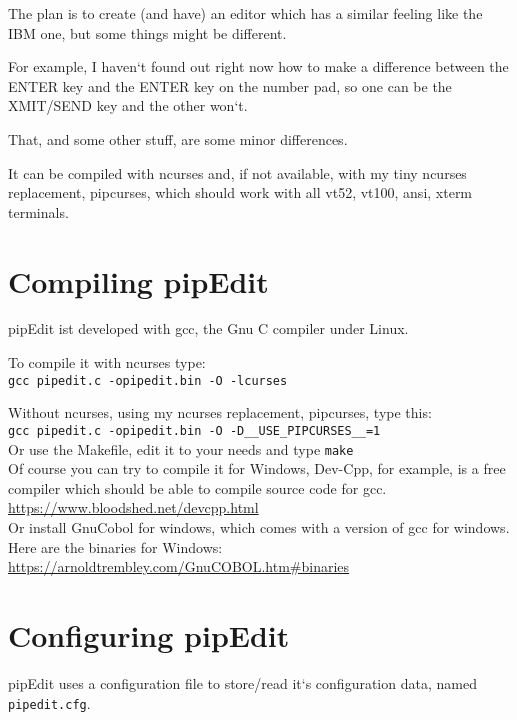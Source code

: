 \documentclass{report}
\begin{document}
The plan is to create (and have) an editor which has a similar feeling like the IBM one, but some things might be different. 


For example, I haven‘t found out right now how to make a difference between the ENTER key and the ENTER key on the number pad, so one can be the XMIT/SEND key and the other won‘t.


That, and some other stuff, are some minor differences.


It can be compiled with ncurses and, if not available, with my tiny ncurses replacement, pipcurses, which should work with all vt52, vt100, ansi, xterm terminals.



\chapter{Compiling pipEdit}

pipEdit ist developed with gcc, the Gnu C compiler under Linux.

To compile it with ncurses type: \\

\texttt{gcc pipedit.c -opipedit.bin -O -lcurses} \break

Without ncurses, using my ncurses replacement, pipcurses, type this: \\

\texttt{gcc pipedit.c -opipedit.bin -O -D\_\_USE\_PIPCURSES\_\_=1} \\

Or use the Makefile, edit it to your needs and type \texttt{make} \\

Of course you can try to compile it for Windows, Dev-Cpp, for example, is a free compiler which should be able to compile source code for gcc. \\
 
\url{https://www.bloodshed.net/devcpp.html} \\

Or install GnuCobol for windows, which comes with a version of gcc for windows.
Here are the binaries for Windows: \\ \break
\url{https://arnoldtrembley.com/GnuCOBOL.htm#binaries}


\chapter{Configuring pipEdit}

pipEdit uses a configuration file to store/read it‘s configuration data, named \texttt{pipedit.cfg}.
\end{document}
